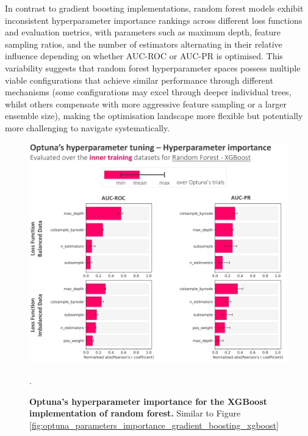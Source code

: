 In contrast  to gradient boosting implementations, random forest models exhibit inconsistent hyperparameter importance rankings across different loss functions and evaluation metrics, with parameters such as maximum depth, feature sampling ratios, and the number of estimators alternating in their relative influence depending on whether AUC-ROC or AUC-PR is optimised. This variability suggests that random forest hyperparameter spaces possess multiple viable configurations that achieve similar performance through different mechanisms (some configurations may excel through deeper individual trees, whilst others compensate with more aggressive feature sampling or a larger ensemble size), making the optimisation landscape more flexible but potentially more challenging to navigate systematically.

\begin{figure}[htbp]
\centering
\includegraphics[scale=0.9]{optuna_parameters_importance_random_forest_xgboost.png}
\caption{\textbf{Optuna's hyperparameter importance for the XGBoost implementation of random forest.} Similar to Figure \ref{fig:optuna_parameters_importance_gradient_boosting_xgboost}}.
\label{fig:optuna_parameters_importance_random_forest_xgboost}
\end{figure}

